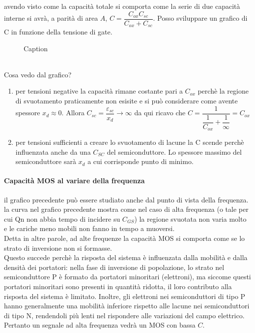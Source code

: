 %
avendo visto come la capacità totale si comporta come la serie di due capacità interne si avrà, a parità di area $A$,  $C= \dfrac{C_{ox}C_{sc}}{C_{ox}+C_{sc}}$. Posso sviluppare un grafico di C in funzione della tensione di gate.
\begin{figure}[hbt!]
    \centering
    \caption{Caption}%
    \label{fig:enter-label}
\end{figure}\\%
Cosa vedo dal grafico?
\begin{enumerate}
    \item per tensioni negative la capacità rimane costante pari a $C_{ox}$ perchè la regione di svuotamento praticamente non esisite e si può considerare come avente spessore $x_d \approx 0$. Allora $C_{sc}=\dfrac{\varepsilon_{sc}}{x_d} \rightarrow \infty$ da qui ricavo che $C=\dfrac{1}{\dfrac{1}{C_{ox}}+\dfrac{1}{\infty}}=C_{ox}$
    \item per tensioni sufficienti a creare lo svuotamento di lacune la C scende perchè influenzata anche da una $C_{SC}$  del semiconduttore. Lo spessore massimo del semiconduttore sarà $x_d$ a cui corrisponde punto di minimo.
\end{enumerate}
%

\paragraph{Capacità MOS al variare della frequenza \mbox{}}
il grafico precedente può essere studiato anche dal punto di vista della frequenza.\\
la curva nel grafico precedente mostra come nel caso di alta frequenza (o tale per cui Qn non abbia tempo di incidere su $C_{GS}$) la regione svuotata non varia molto e le cariche meno mobili non fanno in tempo a muoversi.\\
Detta in altre parole, ad alte frequenze la capacità MOS si comporta come se lo strato di inversione non si formasse. \\
Questo succede perchè la risposta del sistema è influenzata dalla mobilità e dalla densità dei portatori: nella fase di inversione di popolazione, lo strato nel semiconduttore P è formato da portatori minoritari (elettroni), ma siccome questi portatori minoritari sono presenti in quantità ridotta, il loro contributo alla risposta del sistema è limitato. Inoltre, gli elettroni nei semiconduttori di tipo P hanno generalmente una mobilità inferiore rispetto alle lacune nei semiconduttori di tipo N, rendendoli più lenti nel rispondere alle variazioni del campo elettrico.
Pertanto un segnale ad alta frequenza vedrà un MOS con bassa $C$.

